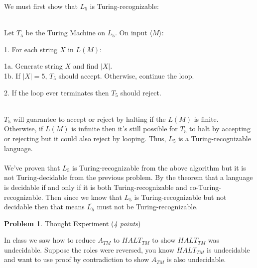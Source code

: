 \documentclass[11pt]{article}
\theoremstyle{definition}
\theoremstyle{theorem}
\newtheorem{prob}{Problem}
\begin{document}
\noindent We must first show that $L_{5}$ is Turing-recognizable: \\~\\
\hspace*{0.9cm}
\begin{minipage}{1.8\textwidth}
Let $T_{5}$ be the Turing Machine on $L_{5}$. On input $\langle M \rangle$: \\
\hspace*{1.2cm}
\begin{minipage}{1.8\textwidth}
\vspace*{0.5cm}
1. For each string $X$ in $L(M)$: \\
	\hspace*{1.7cm}
	\begin{minipage}{0.75\textwidth}
	1a. Generate string $X$ and find $|X|$. \\
	1b. If $|X| = 5$, $T_{5}$ should accept. Otherwise, continue the loop. 
	\vspace*{0.5cm}	
	\end{minipage}

2. If the loop ever terminates then $T_{5}$ should reject.  \\~\\
\end{minipage}
\end{minipage}

\noindent$T_{5}$ will guarantee to accept or reject by halting if the $L(M)$ is finite. \\
Otherwise, if $L(M)$ is infinite then it's still possible for $T_{5}$ to halt by accepting or rejecting but it could also reject by looping. Thus, $L_{5}$ is a Turing-recognizable language. \\~\\
We've proven that $L_{5}$ is Turing-recognizable from the above algorithm but it is not Turing-decidable from the previous problem. By the theorem that a language is decidable if and only if it is both Turing-recognizable and co-Turing-recognizable. Then since we know that $L_{5}$ is Turing-recognizable but not decidable then that means $\overline{L_{5}}$ must not be Turing-recognizable.



\newpage

\begin{prob} Thought Experiment (\emph{4 points})\end{prob}

In class we saw how to reduce $A_{TM}$ to $HALT_{TM}$ to show $HALT_{TM}$ was undecidable. Suppose the roles were reversed, you know $HALT_{TM}$ is undecidable and want to use proof by contradiction to show $A_{TM}$ is also undecidable.
\end{document}
